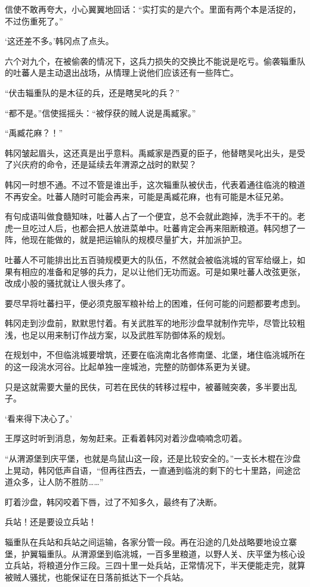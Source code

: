 信使不敢再夸大，小心翼翼地回话：“实打实的是六个。里面有两个本是活捉的，不过伤重死了。”

‘这还差不多。’韩冈点了点头。

六个对九个，在被偷袭的情况下，这兵力损失的交换比不能说是吃亏。偷袭辎重队的吐蕃人是主动退出战场，从情理上说他们应该还有一些阵亡。

“伏击辎重队的是木征的兵，还是瞎吴叱的兵？”

“都不是。”信使摇摇头：“被俘获的贼人说是禹臧家。”

“禹臧花麻？！”

韩冈皱起眉头，这还真是出乎意料。禹臧家是西夏的臣子，他替瞎吴叱出头，是受了兴庆府的命令，还是延续去年渭源之战时的默契？

韩冈一时想不通。不过不管是谁出手，这次辎重队被伏击，代表着通往临洮的粮道不再安全。吐蕃人随时可能会再来，可能是禹臧花麻，也有可能是木征兄弟。

有句成语叫做食髓知味，吐蕃人占了一个便宜，总不会就此跑掉，洗手不干的。老虎一旦吃过人后，也都会把人放进菜单中。吐蕃肯定会再来阻断粮道。韩冈想了一阵，他现在能做的，就是把运输队的规模尽量扩大，并加派护卫。

吐蕃人不可能排出比五百骑规模更大的队伍，不然就会被临洮城的官军给缀上，如果有相应的准备和足够的兵力，足以让他们无功而返。可是如果吐蕃人改弦更张，改成小股的骚扰就让人很头疼了。

要尽早将吐蕃扫平，便必须克服军粮补给上的困难，任何可能的问题都要考虑到。

韩冈走到沙盘前，默默思忖着。有关武胜军的地形沙盘早就制作完毕，尽管比较粗浅，也足以用来制订作战方案，以及武胜军防御体系的规划。

在规划中，不但临洮城要增筑，还要在临洮南北各修南堡、北堡，堵住临洮城所在的这一段洮水河谷。比起单独一座城池，完整的防御体系更为关键。

只是这就需要大量的民伕，可若在民伕的转移过程中，被蕃贼突袭，多半要出乱子。

‘看来得下决心了。’

王厚这时听到消息，匆匆赶来。正看着韩冈对着沙盘喃喃念叨着。

“从渭源堡到庆平堡，也就是鸟鼠山这一段，还是比较安全的。”一支长木棍在沙盘上晃动，韩冈低声自语，“但再往西去，一直通到临洮的剩下的七十里路，间途岔道众多，让人防不胜防……”

盯着沙盘，韩冈咬着下唇，过了不知多久，最终有了决断。

兵站！还是要设立兵站！

辎重队在兵站和兵站之间运输，各家分管一段。再在沿途的几处战略要地设立寨堡，护翼辎重队。从渭源堡到临洮城，一百多里粮道，以野人关、庆平堡为核心设立兵站，将粮道分作三段。三四十里一处兵站，正常情况下，半天便能走完，就算被贼人骚扰，也能保证在日落前抵达下一个兵站。

